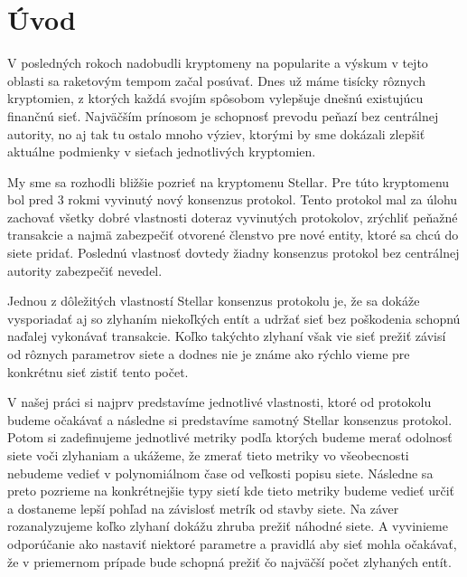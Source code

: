 \chapter*{Úvod} %

V posledných rokoch nadobudli kryptomeny na popularite a výskum v tejto
oblasti sa raketovým tempom začal posúvať. Dnes už máme tisícky rôznych
kryptomien, z ktorých každá svojím spôsobom vylepšuje dnešnú existujúcu
finančnú sieť. Najväčším prínosom je schopnosť prevodu peňazí bez
centrálnej autority, no aj tak tu ostalo mnoho výziev, ktorými by sme
dokázali zlepšiť aktuálne podmienky v sieťach jednotlivých kryptomien.

My sme sa rozhodli bližšie pozrieť na kryptomenu Stellar. Pre túto
kryptomenu bol pred 3 rokmi vyvinutý nový konsenzus protokol. Tento
protokol mal za úlohu zachovať všetky dobré vlastnosti doteraz vyvinutých
protokolov, zrýchliť peňažné transakcie a najmä zabezpečiť otvorené
členstvo pre nové entity, ktoré sa chcú do siete pridať. Poslednú vlastnosť
dovtedy žiadny konsenzus protokol bez centrálnej autority zabezpečiť nevedel.

Jednou z dôležitých vlastností Stellar konsenzus protokolu je, že sa dokáže
vysporiadať aj so zlyhaním niekoľkých entít a udržať sieť bez poškodenia
schopnú naďalej vykonávať transakcie.
Koľko takýchto zlyhaní však vie sieť prežiť závisí od rôznych parametrov siete
a dodnes nie je známe ako rýchlo vieme pre konkrétnu sieť zistiť tento počet.

V našej práci si najprv predstavíme jednotlivé vlastnosti, ktoré od protokolu
budeme očakávať a následne si predstavíme samotný Stellar konsenzus protokol.
Potom si zadefinujeme jednotlivé metriky podľa ktorých budeme merať odolnosť
siete voči zlyhaniam a ukážeme, že zmerať tieto metriky vo všeobecnosti
nebudeme vedieť v polynomiálnom čase od veľkosti popisu siete.
Následne sa preto pozrieme na konkrétnejšie typy sietí kde tieto metriky
budeme vedieť určiť a dostaneme lepší pohľad na závislosť metrík od stavby siete.
Na záver rozanalyzujeme koľko zlyhaní dokážu zhruba prežiť náhodné siete.
A vyvinieme odporúčanie ako nastaviť niektoré parametre a pravidlá aby
sieť mohla očakávať, že v priemernom prípade bude schopná prežiť čo najväčší
počet zlyhaných entít.

